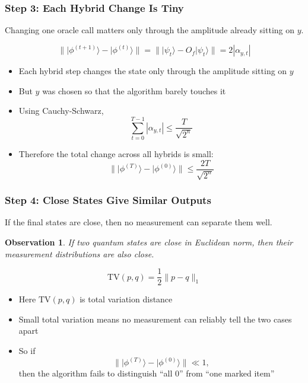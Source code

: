 \documentclass[xcolor=table]{beamer}
\newcommand{\ket}[1]{\lvert #1 \rangle}
\newtheorem{observation}[theorem]{Observation}
\theoremstyle{remark}
\theoremstyle{plain}
\begin{document}
\begin{frame}
  \frametitle{Step 3: Each Hybrid Change Is Tiny}
  {\small Changing one oracle call matters only through the amplitude already sitting on $y$.}

  \vspace{0.4cm}
  \[
    \|\ket{\phi^{(t+1)}}-\ket{\phi^{(t)}}\|
    =
    \|\ket{\psi_t}-O_f\ket{\psi_t}\|
    =
    2|\alpha_{y,t}|
  \]

  {\small
  \begin{itemize}[<+->]
    \item Each hybrid step changes the state only through the amplitude sitting on $y$
    \item But $y$ was chosen so that the algorithm barely touches it
    \item Using Cauchy-Schwarz,
      \[
        \sum_{t=0}^{T-1} |\alpha_{y,t}| \le \frac{T}{\sqrt{2^n}}
      \]
    \item Therefore the total change across all hybrids is small:
      \[
        \|\ket{\phi^{(T)}}-\ket{\phi^{(0)}}\|
        \le \frac{2T}{\sqrt{2^n}}
      \]
  \end{itemize}
  }
\end{frame}

\begin{frame}
  \frametitle{Step 4: Close States Give Similar Outputs}
  {\small If the final states are close, then no measurement can separate them well.}

  \vspace{0.4cm}
  \begin{observation}
    If two quantum states are close in Euclidean norm, then their measurement distributions are also close.
  \end{observation}

  \vspace{0.4cm}

  \[
    \mathrm{TV}(p,q)
    =
    \frac{1}{2}\|p-q\|_1
  \]

  {\small
  \begin{itemize}[<+->]
    \item Here $\mathrm{TV}(p,q)$ is total variation distance
    \item Small total variation means no measurement can reliably tell the two cases apart
    \item So if
      \[
        \|\ket{\phi^{(T)}}-\ket{\phi^{(0)}}\|
        \ll 1,
      \]
      then the algorithm fails to distinguish “all 0” from “one marked item”
  \end{itemize}
  }
\end{frame}
\end{document}
